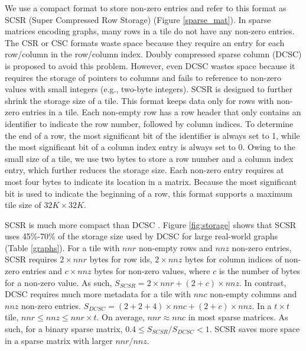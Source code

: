 We use a compact format to store non-zero entries and refer to this
format as SCSR (Super Compressed Row Storage) (Figure \ref{sparse_mat}).
In sparse matrices encoding graphs, many rows in a tile
do not have any non-zero entries. The CSR or CSC formats waste space because
they require an entry for each row/column in the row/column index. Doubly
compressed sparse column (DCSC) \cite{Buluc08} is proposed to avoid this problem.
However, even DCSC wastes space because it requires the storage of
pointers to columns and fails to reference to non-zero values with small
integers (e.g., two-byte integers). SCSR is designed to further shrink the storage
size of a tile. This format keeps data only for rows with non-zero entries in
a tile. Each non-empty row has a row header that only contains an identifier
to indicate the row number, followed by column indices. To determine the end
of a row, the most significant bit of the identifier is always set to 1, while
the most significant bit of a column index entry is always set to 0.
Owing to the small size of a tile, we use two bytes to store a row
number and a column index entry, which further reduces the storage size.
Each non-zero entry requires at most four bytes to indicate its location in
a matrix. Because the most significant bit is used to indicate the beginning
of a row, this format supports a maximum tile size of $32K \times 32K$.

SCSR is much more compact than DCSC \cite{Buluc08}. 
Figure \ref{fig:storage} shows that SCSR uses 45\%-70\% of the storage size used by DCSC
for large real-world graphs (Table \ref{graphs}).
For a tile with $nnr$ non-empty rows and $nnz$ non-zero entries,
SCSR requires $2 \times nnr$ bytes for row ids, $2 \times nnz$ bytes for column
indices of non-zero entries and $c \times nnz$ bytes for non-zero values, where
$c$ is the number of
bytes for a non-zero value. As such, $S_{SCSR} = 2 \times nnr + (2 + c) \times nnz$.
In contrast, DCSC requires much more metadata for a tile
with $nnc$ non-empty columns and $nnz$ non-zero entries.
$S_{DCSC} = (2 + 2 + 4) \times nnc + (2 + c) \times nnz$. In a $t \times t$
tile, $nnr \le nnz \le nnr \times t$. On average, $nnr \approx nnc$ in most sparse
matrices. As such, for a binary sparse matrix, $0.4 \le S_{SCSR} / S_{DCSC} < 1$.
SCSR saves more space in a sparse matrix with larger $nnr / nnz$. 

